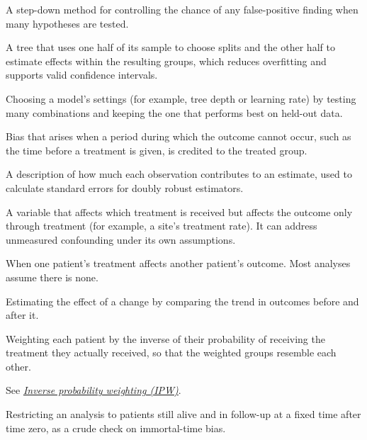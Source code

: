 \begin{description}[style=nextline, leftmargin=1.2em, itemsep=3pt, font=\normalfont\bfseries]
\item[Holm adjustment]
A step-down method for controlling the chance of any false-positive finding when many hypotheses are tested.

\item[Honest tree]
A tree that uses one half of its sample to choose splits and the other half to estimate effects within the resulting groups, which reduces overfitting and supports valid confidence intervals.

\item[Hyperparameter tuning]
Choosing a model's settings (for example, tree depth or learning rate) by testing many combinations and keeping the one that performs best on held-out data.

\item[Immortal-time bias]
Bias that arises when a period during which the outcome cannot occur, such as the time before a treatment is given, is credited to the treated group.

\item[Influence function]
A description of how much each observation contributes to an estimate, used to calculate standard errors for doubly robust estimators.

\item[Instrumental variable]
A variable that affects which treatment is received but affects the outcome only through treatment (for example, a site's treatment rate). It can address unmeasured confounding under its own assumptions.

\item[Interference]
When one patient's treatment affects another patient's outcome. Most analyses assume there is none.

\item[Interrupted time series]
Estimating the effect of a change by comparing the trend in outcomes before and after it.

\item[Inverse probability weighting (IPW)]\label{gl:ipw}
Weighting each patient by the inverse of their probability of receiving the treatment they actually received, so that the weighted groups resemble each other.

\item[IPW]
See \emph{\hyperref[gl:ipw]{Inverse probability weighting (IPW)}}.

\item[Landmark analysis]
Restricting an analysis to patients still alive and in follow-up at a fixed time after time zero, as a crude check on immortal-time bias.


\end{description}
